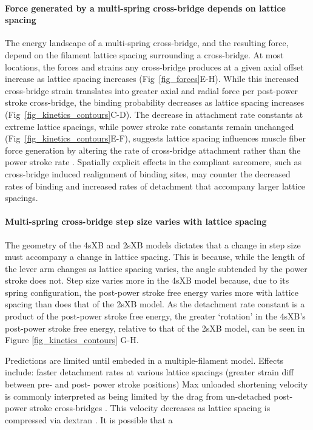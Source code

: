 \documentclass[10pt]{article}
\newcommand{\citep}[1]{\cite{#1}} %
\begin{document}
\paragraph{Force generated by a multi-spring cross-bridge depends on lattice spacing} %
The energy landscape of a multi-spring cross-bridge, and the resulting force, depend on the filament lattice spacing surrounding a cross-bridge. 
At most locations, the forces and strains any cross-bridge produces at a given axial offset increase as lattice spacing increases (Fig~\ref{fig_forces}E-H). 
While this increased cross-bridge strain translates into greater axial and radial force per post-power stroke cross-bridge, the binding probability decreases as lattice spacing increases (Fig~\ref{fig_kinetics_contours}C-D).
The decrease in attachment rate constants at extreme lattice spacings, while power stroke rate constants remain unchanged (Fig~\ref{fig_kinetics_contours}E-F), suggests lattice spacing influences muscle fiber force generation by altering the rate of cross-bridge attachment rather than the power stroke rate \citep{Martyn2004}. 
Spatially explicit effects in the compliant sarcomere, such as cross-bridge induced realignment of binding sites, may counter the decreased rates of binding and increased rates of detachment that accompany larger lattice spacings.

\paragraph{Multi-spring cross-bridge step size varies with lattice spacing} %
The geometry of the 4sXB and 2sXB models dictates that a change in step size must accompany a change in lattice spacing. 
This is because, while the length of the lever arm changes as lattice spacing varies, the angle subtended by the power stroke does not. 
Step size varies more in the 4sXB model because, due to its spring configuration, the post-power stroke free energy varies more with lattice spacing than does that of the 2sXB model. 
As the detachment rate constant is a product of the post-power stroke free energy, the greater `rotation' in the 4sXB's post-power stroke free energy, relative to that of the 2sXB model, can be seen in Figure \ref{fig_kinetics_contours} G-H.

Predictions are limited until embeded in a multiple-filament model.
Effects include: faster detachment rates at various lattice spacings (greater strain diff between pre- and post- power stroke positions)
Max unloaded shortening velocity is commonly interpreted as being limited by the drag from un-detached post-power stroke cross-bridges \cite{gordon2000}. This velocity decreases as lattice spacing is compressed via dextran \cite{goldman1987, metzger1987}. It is possible that a
\end{document}
